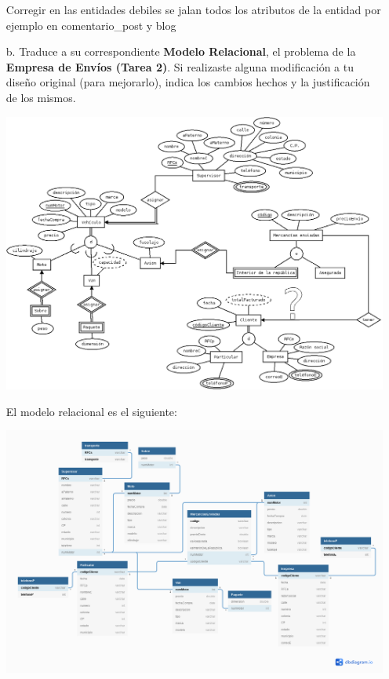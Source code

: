 \documentclass[12pt, letterpaper]{article}
\begin{document}
\begin{itemize}
Corregir en las entidades debiles se jalan todos los atributos de la entidad por ejemplo en comentario_post y blog

            \item[b.] Traduce a su correspondiente \textbf{Modelo Relacional},
                      el problema de la \textbf{Empresa de Envíos (Tarea 2)}.
                      Si realizaste alguna modificación a tu diseño original
                      (para mejorarlo), indica los cambios hechos y la
                      justificación de los mismos.

                      \includegraphics[scale=0.3]{empresa_envios2.png}\vspace{.3cm}

                      El modelo relacional es el siguiente:\vspace{.3cm}

                      \includegraphics[scale=0.3]{Empresa_de_Envios.png}

        \end{itemize}
\end{document}

